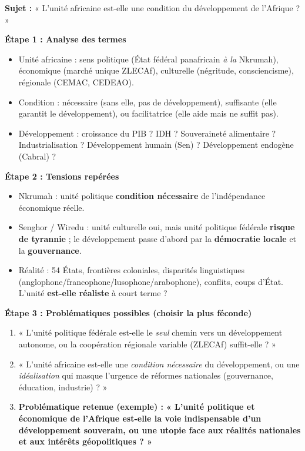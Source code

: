 \documentclass[11pt]{article}
\newcommand{\cle}[1]{{\popxbold\color{popdark}#1}}
\begin{document}
\begin{exemplebox}
\textbf{Sujet :} « L'unité africaine est-elle une condition du développement de l'Afrique ? »

\textbf{Étape 1 : Analyse des termes}
\begin{itemize}
    \item \cle{Unité africaine} : sens politique (État fédéral panafricain \textit{à la} Nkrumah), économique (marché unique ZLECAf), culturelle (négritude, consciencisme), régionale (CEMAC, CEDEAO).
    \item \cle{Condition} : nécessaire (sans elle, pas de développement), suffisante (elle garantit le développement), ou facilitatrice (elle aide mais ne suffit pas).
    \item \cle{Développement} : croissance du PIB ? IDH ? Souveraineté alimentaire ? Industrialisation ? Développement humain (Sen) ? Développement endogène (Cabral) ?
\end{itemize}

\textbf{Étape 2 : Tensions repérées}
\begin{itemize}
    \item Nkrumah : unité politique \textbf{condition nécessaire} de l'indépendance économique réelle.
    \item Senghor / Wiredu : unité culturelle oui, mais unité politique fédérale \textbf{risque de tyrannie} ; le développement passe d'abord par la \textbf{démocratie locale} et la \textbf{gouvernance}.
    \item Réalité : 54 États, frontières coloniales, disparités linguistiques (anglophone/francophone/lusophone/arabophone), conflits, coups d'État. L'unité \textbf{est-elle réaliste} à court terme ?
\end{itemize}

\textbf{Étape 3 : Problématiques possibles (choisir la plus féconde)}
\begin{enumerate}
    \item « L'unité politique fédérale est-elle le \emph{seul} chemin vers un développement autonome, ou la coopération régionale variable (ZLECAf) suffit-elle ? »
    \item « L'unité africaine est-elle une \emph{condition nécessaire} du développement, ou une \emph{idéalisation} qui masque l'urgence de réformes nationales (gouvernance, éducation, industrie) ? »
    \item \textbf{Problématique retenue (exemple) :} \textbf{« L'unité politique et économique de l'Afrique est-elle la voie indispensable d'un développement souverain, ou une utopie face aux réalités nationales et aux intérêts géopolitiques ? »}
\end{enumerate}
\end{exemplebox}
\end{document}

